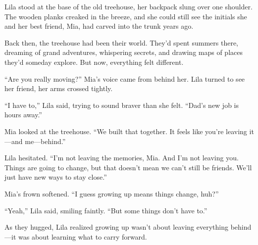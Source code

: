 \documentclass[12pt]{article}
\begin{document}
\begin{tcolorbox}[colframe=black!60, colback=white, 
coltitle=black, colbacktitle=black!15, fonttitle=\bfseries\Large, 
title=The Old Treehouse, halign title=center, left=10pt, right=10pt, top=10pt, bottom=15pt]

Lila stood at the base of the old treehouse, her backpack slung over one shoulder. The wooden planks creaked in the breeze, and she could still see the initials she and her best friend, Mia, had carved into the trunk years ago.

Back then, the treehouse had been their world. They’d spent summers there, dreaming of grand adventures, whispering secrets, and drawing maps of places they’d someday explore. But now, everything felt different.

“Are you really moving?” Mia’s voice came from behind her. Lila turned to see her friend, her arms crossed tightly.

“I have to,” Lila said, trying to sound braver than she felt. “Dad’s new job is hours away.”

Mia looked at the treehouse. “We built that together. It feels like you’re leaving it—and me—behind.”

Lila hesitated. “I’m not leaving the memories, Mia. And I’m not leaving you. Things are going to change, but that doesn’t mean we can’t still be friends. We’ll just have new ways to stay close.”

Mia’s frown softened. “I guess growing up means things change, huh?”

“Yeah,” Lila said, smiling faintly. “But some things don’t have to.”

As they hugged, Lila realized growing up wasn’t about leaving everything behind—it was about learning what to carry forward.

 

 

\end{tcolorbox}
\end{document}
